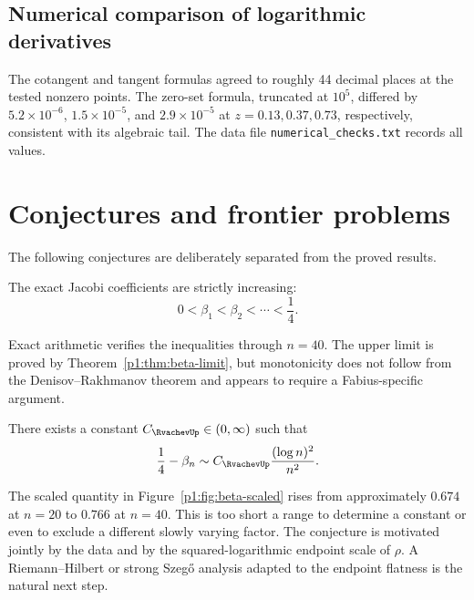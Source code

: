 \documentclass[11pt]{article}
\theoremstyle{definition}
\theoremstyle{remark}
\begin{document}
\subsection{Numerical comparison of logarithmic derivatives}

The cotangent and tangent formulas agreed to roughly 44 decimal places at the tested
nonzero points.  The zero-set formula, truncated at \(10^5\), differed by
\(5.2\times10^{-6}\), \(1.5\times10^{-5}\), and \(2.9\times10^{-5}\) at
\(z=0.13,0.37,0.73\), respectively, consistent with its algebraic tail.  The data file
\texttt{numerical\_checks.txt} records all values.

\section{Conjectures and frontier problems}

The following conjectures are deliberately separated from the proved results.

\begin{conjecture}\label{p1:conj:beta-monotone}
The exact Jacobi coefficients are strictly increasing:
\begin{equation}
 0<\beta_1<\beta_2<\cdots<\frac14.                            \label{p1:eq:beta-monotone}
\end{equation}
\end{conjecture}

Exact arithmetic verifies the inequalities through \(n=40\).  The upper limit is proved by
Theorem~\ref{p1:thm:beta-limit}, but monotonicity does not follow from the
Denisov--Rakhmanov theorem and appears to require a Fabius-specific argument.

\begin{conjecture}\label{p1:conj:beta-rate}
There exists a constant \(C_{\RvachevUp}\in(0,\infty)\) such that
\begin{equation}
 \frac14-\beta_n
 \sim C_{\RvachevUp}\frac{(\log n)^2}{n^2}.                         \label{p1:eq:beta-rate}
\end{equation}
\end{conjecture}

The scaled quantity in Figure~\ref{p1:fig:beta-scaled} rises from approximately \(0.674\) at
\(n=20\) to \(0.766\) at \(n=40\).  This is too short a range to determine a constant or
even to exclude a different slowly varying factor.  The conjecture is motivated jointly by
the data and by the squared-logarithmic endpoint scale of \(\rho\).  A Riemann--Hilbert or
strong Szeg\H{o} analysis adapted to the endpoint flatness is the natural next step.
\end{document}
